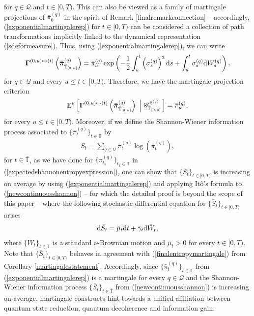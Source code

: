 \documentclass[12pt,a4paper]{article}
\def\T{\mathbb{T}}
\def\dd{\mathrm{d}}
\def\G{\mathscr{G}}
\begin{document}
for $q\in\mathcal{Q}$ and $t\in[0,T)$. This can also be viewed as a family of martingale projections of $\bar{\pi}^{(q)}_{0}$ in the spirit of Remark \ref{finalremarkconnection} -- accordingly, (\ref{exponentialmartingalerep}) for $t\in[0,T)$ can be considered a collection of path transformations implicitly linked to the dynamical representation (\ref{sdeformeasure}). Thus, using (\ref{exponentialmartingalerep}), we can write
\begin{align}
\boldsymbol{\Gamma}^{(0,u)\mapsto(t)}\left(  \boldsymbol{\bar{\pi}}^{(q)}_{\bar{\T}_{[0,u]}} \right) = \bar{\pi}^{(q)}_{u}\exp\left(- \frac{1}{2}\int_u^t \left(\sigma^{(q)}_{s}\right)^2\dd s + \int_u^t \sigma^{(q)}_{s}\dd W^{(q)}_s \right), \notag
\end{align}
for $q\in\mathcal{Q}$ and every $u\leq t\in[0,T)$. Therefore, we have the martingale projection criterion
\begin{align}
\mathbb{E}^{\nu}\left[\boldsymbol{\Gamma}^{(0,u)\mapsto(t)}\left(  \boldsymbol{\bar{\pi}}^{(q)}_{\bar{\T}_{[0,u]}} \right)  \,\, \left| \,\, \G^{\bar{\pi}^{(q)}}_{\bar{\T}_{[0,u]}} \right.\right] = \bar{\pi}^{(q)}_{u}, \notag
\end{align}
for every $u\leq t\in[0,T)$. Moreover, if we define the Shannon-Wiener information process associated to $\{\bar{\pi}^{(q)}_{t}\}_{t\in\bar{\T}}$ by
\begin{align}
\bar{S}_t = \sum_{q\in\mathcal{Q}}\bar{\pi}^{(q)}_{t} \log\left( \bar{\pi}^{(q)}_{t} \right), \label{newcontinuousshannon}
\end{align}
for $t\in\bar{\T}$, as we have done for $\{\pi^{(q)}_{t_{k}}\}_{t_k\in\T}$ in (\ref{expectedshannonentropyexpression}), one can show that $\{\bar{S}_t\}_{t\in[0,T)}$ is increasing on average by using (\ref{exponentialmartingalerep}) and applying It\^o's formula to (\ref{newcontinuousshannon}) -- for which the detailed proof is beyond the scope of this paper -- where the following stochastic differential equation for $\{\bar{S}_t\}_{t\in[0,T)}$ arises
\begin{align}
\dd\bar{S}_t = \bar{\mu}_{t}\dd t + \bar{\gamma}_{t}\dd \bar{W}_t, \notag
\end{align}
where $\{\bar{W}_t\}_{t\in\T}$ is a standard $\nu$-Brownian motion and $\bar{\mu}_t > 0$ for every $t\in[0,T)$. Note that $\{\bar{S}_t\}_{t\in[0,T)}$ behaves in agreement with (\ref{finalentropymartingale}) from Corollary \ref{martingalestatement}. Accordingly, since $\{\bar{\pi}^{(q)}_{t}\}_{t\in\bar{\T}}$ from (\ref{exponentialmartingalerep}) is a martingale for every $q\in\mathcal{Q}$ and the Shannon-Wiener information process $\{\bar{S}_{t}\}_{t\in\bar{\T}}$ from (\ref{newcontinuousshannon}) is increasing on average, martingale constructs hint towards a unified affiliation between quantum state reduction, quantum decoherence and information gain. 
\end{document}
